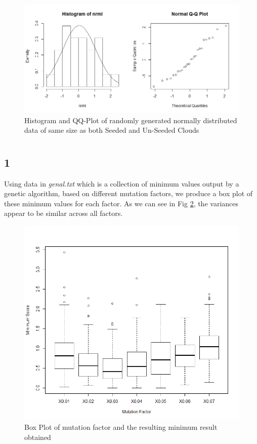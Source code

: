 \documentclass{article}
\begin{document}
    \begin{figure}[H]
      \includegraphics[scale=0.3]{../results/2_3_nrml.png}
      \caption{Histogram and QQ-Plot of randomly generated normally distributed data of same size as both Seeded and Un-Seeded Clouds}
      \label{fig:normal}
    \end{figure}
    
    \section{}
    \subsection*{1}
    Using data in \textit{genal.txt} which is a collection of minimum values output by a genetic algorithm, based on different mutation factors, we produce a box plot of these minimum values for each factor. As we can see in Fig \ref{fig:box}, the variances appear to be similar across all factors.
    
    \begin{figure}[H]
    \centering
      \includegraphics[scale=0.3]{../results/3_1.png}
      \caption{Box Plot of mutation factor and the resulting minimum result obtained}
      \label{fig:box}
    \end{figure}
    
\end{document}
